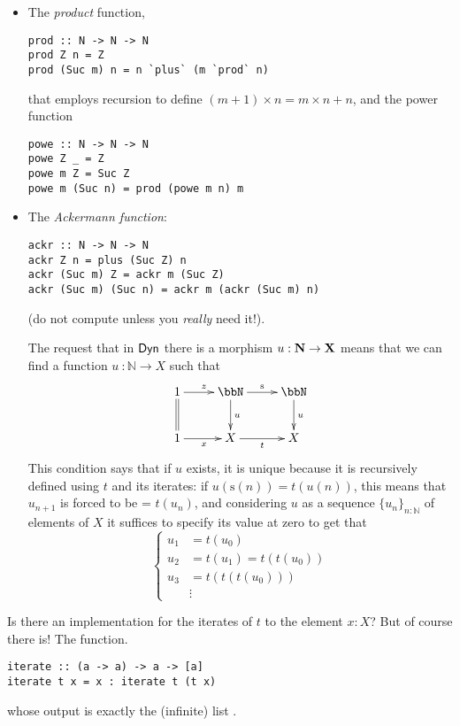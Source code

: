 \documentclass[11pt]{article}
\begin{document}
\begin{itemize}
	\item The \emph{product} function,
\begin{verbatim}
prod :: N -> N -> N
prod Z n = Z
prod (Suc m) n = n `plus` (m `prod` n)
\end{verbatim}
that employs recursion to define \((m+1)\times n = m\times n + n\), and the power function
\begin{verbatim}
powe :: N -> N -> N
powe Z _ = Z
powe m Z = Suc Z
powe m (Suc n) = prod (powe m n) m
\end{verbatim}
	\item The \emph{Ackermann function}:
\begin{verbatim}
ackr :: N -> N -> N
ackr Z n = plus (Suc Z) n
ackr (Suc m) Z = ackr m (Suc Z)
ackr (Suc m) (Suc n) = ackr m (ackr (Suc m) n)
\end{verbatim}
(do not compute  unless you \emph{really} need it!).

The request that in \(\sf Dyn\) there is a morphism \(u : \bf N\to \bf X\) means that we can find a function \(u\ : \mathbb N \to X\) such that
\[
	\xymatrix{
	1 \ar@{=}[d] \ar[r]^z & \bbN \ar[r]^{\text{s}} \ar[d]^u & \bbN \ar[d]^u \\
	1 \ar[r]_x & X \ar[r]_t & X
	}
\]
This condition says that if \(u\) exists, it is unique because it is recursively defined using \(t\) and its iterates: if \(u(\text{s}(n))=t(u(n))\), this means that \(u_{n+1}\) is forced to be =  \(t(u_n)\), and considering \(u\) as a sequence \(\{u_n\}_{n :\mathbb N}\) of elements of \(X\) it suffices to specify its value at zero to get that
\begin{equation*}
	\begin{cases}
		u_1 & = t(u_0)             \\
		u_2 & = t(u_1) = t(t(u_0)) \\
		u_3 & = t(t(t(u_0)))       \\
		    & \vdots
	\end{cases}
\end{equation*}
\end{itemize}
Is there an implementation for the iterates of \(t\) to the element \(x : X\)? But of course there is! The  function.
\begin{verbatim}
iterate :: (a -> a) -> a -> [a]
iterate t x = x : iterate t (t x)
\end{verbatim}
whose output is exactly the (infinite) list \mil{[x, t x, t t x, t t t x, ...]}.
\end{document}
